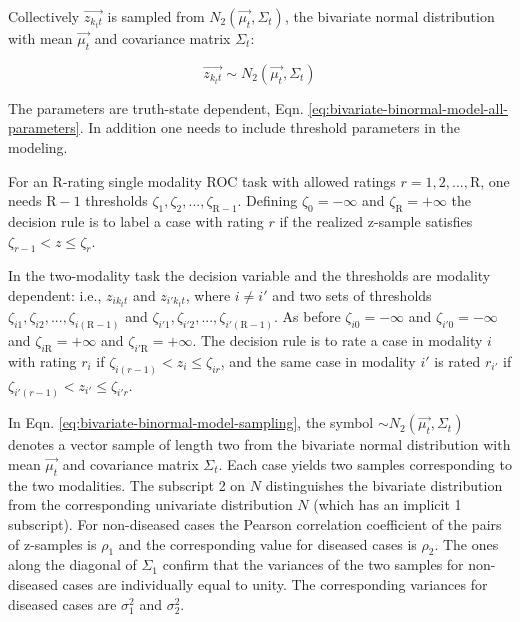 \documentclass[
]{book}
\begin{document}
Collectively \(\overrightarrow{z_{k_tt}}\) is sampled from \(N_2\left( \overrightarrow{\mu_t}, \Sigma_t \right)\), the bivariate normal distribution with mean \(\overrightarrow{\mu_t}\) and covariance matrix \(\Sigma_t\):

\begin{equation}
\overrightarrow{z_{k_tt}} \sim  N_2\left( \overrightarrow{\mu_t}, \Sigma_t \right)
\label{eq:bivariate-binormal-model-sampling}
\end{equation}

The parameters are truth-state dependent, Eqn. \eqref{eq:bivariate-binormal-model-all-parameters}. In addition one needs to include threshold parameters in the modeling.

For an R-rating single modality ROC task with allowed ratings \(r = 1, 2, ..., \text{R}\), one needs \(\text{R}-1\) thresholds \(\zeta_1,\zeta_2,...,\zeta_{\text{R}-1}\). Defining \(\zeta_0 = -\infty\) and \(\zeta_{\text{R}} = +\infty\) the decision rule is to label a case with rating \(r\) if the realized z-sample satisfies \(\zeta_{r-1} < z \le \zeta_r\).

In the two-modality task the decision variable and the thresholds are modality dependent: i.e., \(z_{ik_tt}\) and \(z_{i'k_tt}\), where \(i \ne i'\) and two sets of thresholds \(\zeta_{i1},\zeta_{i2},...,\zeta_{i (\text{R}-1)}\) and \(\zeta_{i'1},\zeta_{i'2},...,\zeta_{i' (\text{R}-1)}\). As before \(\zeta_{i0} = -\infty\) and \(\zeta_{i'0} = -\infty\) and \(\zeta_{i\text{R}} = +\infty\) and \(\zeta_{i'\text{R}} = +\infty\). The decision rule is to rate a case in modality \(i\) with rating \(r_i\) if \(\zeta_{i(r-1)} < z_i \le \zeta_{ir}\), and the same case in modality \(i'\) is rated \(r_{i'}\) if \(\zeta_{i'(r-1)} < z_{i'} \le \zeta_{i'r}\).

In Eqn. \eqref{eq:bivariate-binormal-model-sampling}, the symbol \(\sim N_2\left( \overrightarrow{\mu_t}, \Sigma_t \right)\) denotes a vector sample of length two from the bivariate normal distribution with mean \(\overrightarrow{\mu_t}\) and covariance matrix \(\Sigma_t\). Each case yields two samples corresponding to the two modalities. The subscript 2 on \(N\) distinguishes the bivariate distribution from the corresponding univariate distribution \(N\) (which has an implicit 1 subscript). For non-diseased cases the Pearson correlation coefficient of the pairs of z-samples is \(\rho_1\) and the corresponding value for diseased cases is \(\rho_2\). The ones along the diagonal of \(\Sigma_1\) confirm that the variances of the two samples for non-diseased cases are individually equal to unity. The corresponding variances for diseased cases are \(\sigma_1^2\) and \(\sigma_2^2\).
\end{document}
